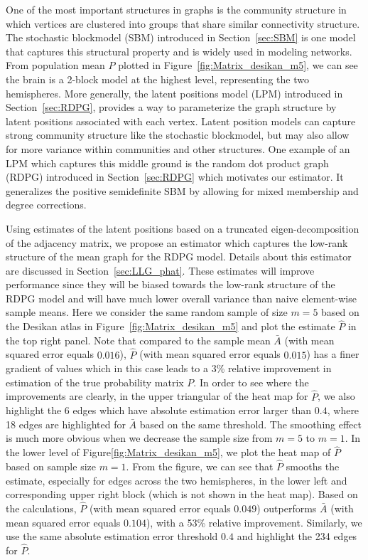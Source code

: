 One of the most important structures in graphs is the community structure in which vertices are clustered into groups that share similar connectivity structure. The stochastic blockmodel (SBM) \citep{holland1983stochastic} introduced in Section~\ref{sec:SBM} is one model that captures this structural property and is widely used in modeling networks. From population mean $P$ plotted in Figure~\ref{fig:Matrix_desikan_m5}, we can see the brain is a 2-block model at the highest level, representing the two hemispheres.
More generally, the latent positions model (LPM) \citep{hoff2002latent} introduced in Section~\ref{sec:RDPG}, provides a way to parameterize the graph structure by latent positions associated with each vertex. 
Latent position models can capture strong community structure like the stochastic blockmodel, but may also allow for more variance within communities and other structures.
One example of an LPM which captures this middle ground is the random dot product graph (RDPG) \citep{young2007random, nickel2007random} introduced in Section~\ref{sec:RDPG} which motivates our estimator. It generalizes the positive semidefinite SBM by allowing for mixed membership and degree corrections.

Using estimates of the latent positions based on a truncated eigen-decomposition of the adjacency matrix, we propose an estimator which captures the low-rank structure of the mean graph for the RDPG model. Details about this estimator are discussed in Section~\ref{sec:LLG_phat}.
These estimates will improve performance since they will be biased towards the low-rank structure of the RDPG model and will have much lower overall variance than naive element-wise sample means. Here we consider the same random sample of size $m=5$ based on the Desikan atlas in Figure~\ref{fig:Matrix_desikan_m5} and plot the estimate $\hat{P}$ in the top right panel. Note that compared to the sample mean $\bar{A}$ (with mean squared error equals $0.016$), $\hat{P}$ (with mean squared error equals $0.015$) has a finer gradient of values which in this case leads to a 3\% relative improvement in estimation of the true probability matrix $P$. In order to see where the improvements are clearly, in the upper triangular of the heat map for $\hat{P}$, we also highlight the 6 edges which have absolute estimation error larger than $0.4$, where 18 edges are highlighted for $\bar{A}$ based on the same threshold. 
The smoothing effect is much more obvious when we decrease the sample size from $m = 5$ to $m = 1$. In the lower level of Figure\ref{fig:Matrix_desikan_m5}, we plot the heat map of $\hat{P}$ based on sample size $m = 1$. From the figure, we can see that $\hat{P}$ smooths the estimate, especially for edges across the two hemispheres, in the lower left and corresponding upper right block (which is not shown in the heat map). Based on the calculations, $\hat{P}$ (with mean squared error equals $0.049$) outperforms $\bar{A}$ (with mean squared error equals $0.104$), with a 53\% relative improvement. Similarly, we use the same absolute estimation error threshold $0.4$ and highlight the 234 edges for $\hat{P}$.


